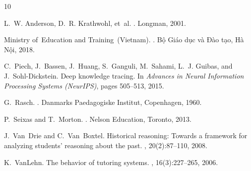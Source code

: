 \documentclass[11pt,a4paper]{article}
\begin{document}

\begin{thebibliography}{10}

L.~W. Anderson, D.~R. Krathwohl, et~al.
.
\newblock Longman, 2001.

Ministry of~Education and Training~(Vietnam).
.
\newblock Bộ Giáo dục và Đào tạo, Hà Nội, 2018.

C.~Piech, J.~Bassen, J.~Huang, S.~Ganguli, M.~Sahami, L.~J. Guibas, and J.~Sohl-Dickstein.
\newblock Deep knowledge tracing.
\newblock In {\em Advances in Neural Information Processing Systems (NeurIPS)}, pages 505--513, 2015.

G.~Rasch.
.
\newblock Danmarks Paedagogiske Institut, Copenhagen, 1960.

P.~Seixas and T.~Morton.
.
\newblock Nelson Education, Toronto, 2013.

J.~Van~Drie and C.~Van~Boxtel.
\newblock Historical reasoning: Towards a framework for analyzing students' reasoning about the past.
, 20(2):87--110, 2008.

K.~VanLehn.
\newblock The behavior of tutoring systems.
, 16(3):227--265, 2006.

\end{thebibliography}
\end{document}
